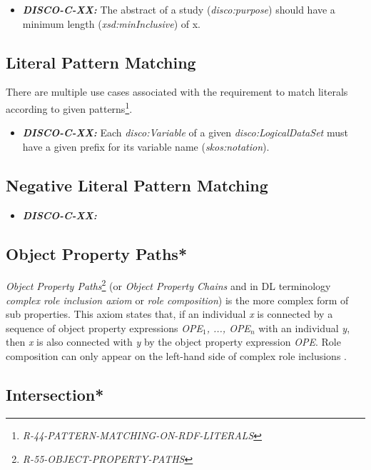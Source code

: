 \documentclass{llncs}
\begin{document}
\begin{itemize}
	\item \textbf{{\em DISCO-C-XX:}} The abstract of a study (\emph{disco:purpose}) should have a minimum length (\emph{xsd:minInclusive}) of x. 
\end{itemize}

\subsection{Literal Pattern Matching}

There are multiple use cases associated with the requirement to match literals according to given patterns\footnote{\emph{R-44-PATTERN-MATCHING-ON-RDF-LITERALS}}.

\begin{itemize}
	\item \textbf{{\em DISCO-C-XX:}} Each \emph{disco:Variable} of a given \emph{disco:LogicalDataSet} must have a given prefix for its variable name (\emph{skos:notation}). 
\end{itemize}

\subsection{Negative Literal Pattern Matching}

\begin{itemize}
	\item \textbf{{\em DISCO-C-XX:}} 
\end{itemize}

\subsection{Object Property Paths*}

\emph{Object Property Paths}\footnote{\emph{R-55-OBJECT-PROPERTY-PATHS}} (or \emph{Object Property Chains} and in DL terminology \emph{complex role inclusion axiom} or \emph{role composition}) is the more complex form of sub properties. 
This axiom states that, if an individual \emph{x} is connected by a sequence of object property expressions \emph{OPE$_1$, ..., OPE$_n$} with an individual \emph{y}, then \emph{x} is also connected with \emph{y} by the object property expression \emph{OPE}.  
Role composition can only appear on the left-hand side of complex role inclusions \cite{Kroetzsch2012}.

\subsection{Intersection*}
\end{document}
